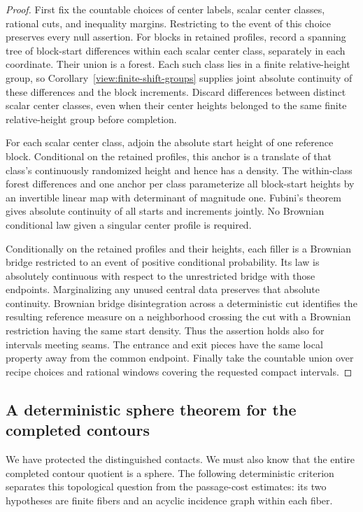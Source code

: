\begin{proof}
First fix the countable choices of center labels, scalar center classes,
rational cuts, and inequality margins.  Restricting to the event of
this choice preserves every null assertion.  For blocks in retained
profiles, record a spanning tree of block-start differences within
each scalar center class, separately in each coordinate.  Their union
is a forest.  Each such class lies
in a finite relative-height group, so
Corollary~\ref{view:finite-shift-groups} supplies joint absolute
continuity of these differences and the block increments.  Discard
differences between distinct scalar center classes, even when their
center heights belonged to the same finite relative-height group before
completion.

For each scalar center class, adjoin the absolute start height of one
reference block.  Conditional on the retained profiles, this anchor is
a translate of that class's continuously randomized height and hence
has a density.  The within-class forest differences and one anchor per
class parameterize all block-start heights by an invertible linear map
with determinant of magnitude one.  Fubini's theorem gives absolute
continuity of all starts and increments jointly.  No Brownian conditional
law given a singular center profile is required.

Conditionally on the retained profiles and their heights, each filler is
a Brownian bridge restricted to an event of positive conditional
probability.  Its law is absolutely continuous with respect to the
unrestricted bridge with those endpoints.  Marginalizing any unused
central data preserves that absolute continuity.  Brownian bridge
disintegration across a deterministic cut identifies the resulting
reference measure on a neighborhood crossing the cut with a Brownian
restriction having the same start density.  Thus the assertion holds
also for intervals meeting seams.  The entrance and exit pieces have
the same local property away from the common endpoint.  Finally take
the countable union over recipe choices and rational windows covering
the requested compact intervals.
\end{proof}

\subsection{A deterministic sphere theorem for the completed contours}

We have protected the distinguished contacts.  We must also know that
the entire completed contour quotient is a sphere.  The following
deterministic criterion separates this topological question from the
passage-cost estimates: its two hypotheses are finite fibers and an
acyclic incidence graph within each fiber.

